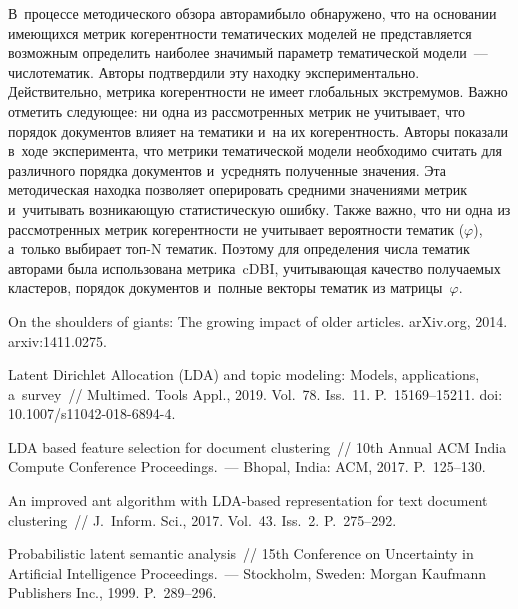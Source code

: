 \begin{multicols}{2}
    В~процессе методического обзора авторами\linebreak было обнаружено, что на основании 
имеющихся мет\-рик когерентности тематических моделей не представляется возможным 
определить наиболее значимый параметр тематической модели~--- число\linebreak тематик.
    Авторы подтвердили эту находку экспериментально.
    Действительно, метрика когерентности не имеет глобальных экстремумов.
    Важно отметить следующее: ни одна из рассмотренных метрик не учитывает, 
что порядок документов влияет на тематики и~на их когерентность.
    Авторы показали в~ходе эксперимента, что метрики тематической модели 
необходимо считать для различного порядка документов и~усреднять полученные 
значения.
    Эта методическая находка позволяет оперировать средними значениями метрик 
и~учитывать возникающую статистическую ошибку.
    Также важно, что ни одна из рассмотренных метрик когерентности  не 
учитывает вероятности тематик ($\varphi$), а~только выбирает топ-N  тематик.
    Поэтому для определения числа тематик авторами была использована 
    мет\-ри\-ка~$\mathrm{cDBI}$, учитывающая качество получаемых кластеров, порядок документов и~полные 
векторы тематик из мат\-ри\-цы~$\varphi$.
    
{\small\frenchspacing
 {%
 \begin{thebibliography}{99}

 On the shoulders of giants: The growing impact of older articles. 
arXiv.org, 2014. arxiv:1411.0275.

 Latent 
Dirichlet Allocation (LDA) and topic modeling: Models, applications, a~survey~// 
Multimed. Tools  Appl., 2019. Vol.~78. Iss.~11. P.~15169--15211. doi: 
10.1007/s11042-018-6894-4.

 LDA based feature 
selection for document clustering~// 10th Annual ACM India 
Compute Conference Proceedings.~--- Bhopal, India: ACM, 2017. P.~125--130.

 An improved 
ant algorithm with LDA-based representation for text document clustering~// 
J.~Inform. Sci., 2017. Vol.~43. Iss.~2. P.~275--292.

  Probabilistic latent 
semantic analysis~// 15th Conference on Uncertainty in 
Artificial Intelligence Proceedings.~--- 
Stockholm, Sweden: Morgan Kaufmann Publishers Inc.,  1999. P.~289--296.


\end{thebibliography}}}
\end{multicols}
